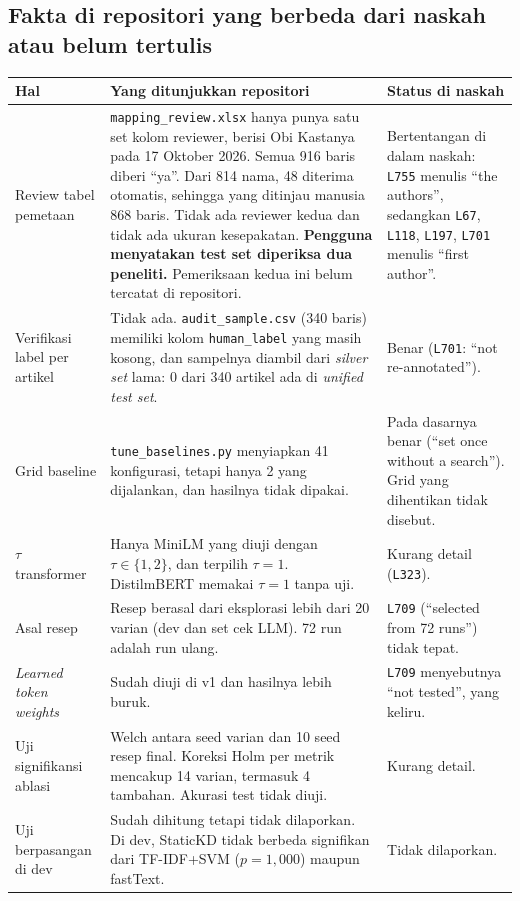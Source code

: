 \documentclass[10pt,a4paper]{article}
\newcommand{\old}[1]{\texttt{L#1}}
\begin{document}
\subsection{Fakta di repositori yang berbeda dari naskah atau belum tertulis}
\begin{longtable}{@{}p{}p{}p{}@{}}
\toprule
Hal & Yang ditunjukkan repositori & Status di naskah\\
\midrule
\endhead
Review tabel pemetaan & \texttt{mapping\_review.xlsx} hanya punya satu set kolom reviewer, berisi Obi Kastanya pada 17 Oktober 2026. Semua 916 baris diberi ``ya''. Dari 814 nama, 48 diterima otomatis, sehingga yang ditinjau manusia 868 baris. Tidak ada reviewer kedua dan tidak ada ukuran kesepakatan. \textbf{Pengguna menyatakan test set diperiksa dua peneliti.} Pemeriksaan kedua ini belum tercatat di repositori. & Bertentangan di dalam naskah: \old{755} menulis ``the authors'', sedangkan \old{67}, \old{118}, \old{197}, \old{701} menulis ``first author''.\\
Verifikasi label per artikel & Tidak ada. \texttt{audit\_sample.csv} (340 baris) memiliki kolom \texttt{human\_label} yang masih kosong, dan sampelnya diambil dari \emph{silver set} lama: 0 dari 340 artikel ada di \emph{unified test set}. & Benar (\old{701}: ``not re-annotated'').\\
Grid baseline & \texttt{tune\_baselines.py} menyiapkan 41 konfigurasi, tetapi hanya 2 yang dijalankan, dan hasilnya tidak dipakai. & Pada dasarnya benar (``set once without a search''). Grid yang dihentikan tidak disebut.\\
$\tau$ transformer & Hanya MiniLM yang diuji dengan $\tau\in\{1,2\}$, dan terpilih $\tau=1$. DistilmBERT memakai $\tau=1$ tanpa uji. & Kurang detail (\old{323}).\\
Asal resep & Resep berasal dari eksplorasi lebih dari 20 varian (dev dan set cek LLM). 72 run adalah run ulang. & \old{709} (``selected from 72 runs'') tidak tepat.\\
\emph{Learned token weights} & Sudah diuji di v1 dan hasilnya lebih buruk. & \old{709} menyebutnya ``not tested'', yang keliru.\\
Uji signifikansi ablasi & Welch antara seed varian dan 10 seed resep final. Koreksi Holm per metrik mencakup 14 varian, termasuk 4 tambahan. Akurasi test tidak diuji. & Kurang detail.\\
Uji berpasangan di dev & Sudah dihitung tetapi tidak dilaporkan. Di dev, StaticKD tidak berbeda signifikan dari TF-IDF+SVM ($p=1{,}000$) maupun fastText. & Tidak dilaporkan.\\

\end{longtable}
\end{document}

